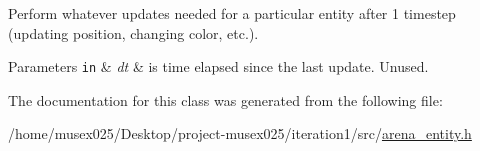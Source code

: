 Perform whatever updates needed for a particular entity after 1 timestep (updating position, changing color, etc.). 


\begin{DoxyParams}[1]{Parameters}
\mbox{\tt in}  & {\em dt} & is time elapsed since the last update. Unused. \\
\hline
\end{DoxyParams}


The documentation for this class was generated from the following file\+:\begin{DoxyCompactItemize}
\item 
/home/musex025/\+Desktop/project-\/musex025/iteration1/src/\hyperlink{arena__entity_8h}{arena\+\_\+entity.\+h}\end{DoxyCompactItemize}
